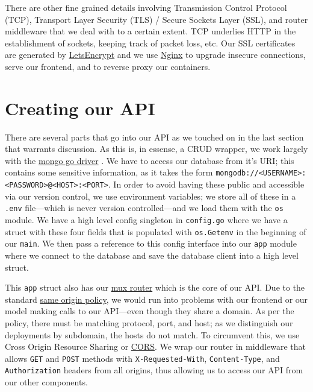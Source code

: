 \documentclass[11pt, twoside, reqno]{book}
\begin{document}
There are other fine grained details involving Transmission Control Protocol (TCP), Transport Layer Security (TLS) / Secure Sockets Layer (SSL), and router middleware that we deal with to a certain extent. TCP underlies HTTP in the establishment of sockets, keeping track of packet loss, etc. Our SSL certificates are generated by \href{https://letsencrypt.org/}{LetsEncrypt} and we use \href{https://www.nginx.com}{Nginx} to upgrade insecure connections, serve our frontend, and to reverse proxy our containers.


\section{Creating our API}

There are several parts that go into our API as we touched on in the last section that warrants discussion. As this is, in essense, a CRUD wrapper, we work largely with the \href{https://godoc.org/go.mongodb.org/mongo-driver/mongo}{mongo go driver} \cite{mongoGoD17:online}. We have to access our database from it's URI; this contains some sensitive information, as it takes the form \texttt{mongodb://<USERNAME>:<PASSWORD>@<HOST>:<PORT>}. In order to avoid having these public and accessible via our version control, we use environment variables; we store all of these in a \texttt{.env} file—which is never version controlled—and we load them with the \texttt{os} module. We have a high level config singleton in \texttt{config.go} where we have a struct with these four fields that is populated with \texttt{os.Getenv} in the beginning of our \texttt{main}. We then pass a reference to this config interface into our \texttt{app} module where we connect to the database and save the database client into a high level struct.

This \texttt{app} struct also has our \href{http://www.gorillatoolkit.org/pkg/mux}{mux router} which is the core of our API. Due to the standard \href{https://developer.mozilla.org/en-US/docs/Web/Security/Same-origin_policy}{same origin policy}, we would run into problems with our frontend or our model making calls to our API—even though they share a domain. As per the policy, there must be matching protocol, port, and host; as we distinguish our deployments by subdomain, the hosts do not match. To circumvent this, we use Cross Origin Resource Sharing or \href{https://developer.mozilla.org/en-US/docs/Web/HTTP/CORS}{CORS}. We wrap our router in middleware that allows \texttt{GET} and \texttt{POST} methods with \texttt{X-Requested-With}, \texttt{Content-Type}, and \texttt{Authorization} headers from all origins, thus allowing us to access our API from our other components.
\end{document}

